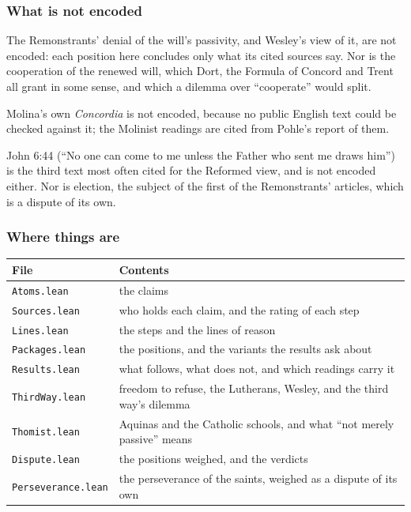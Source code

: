 \documentclass[11pt]{article}
\begin{document}
\subsubsection*{What is not encoded}
The Remonstrants’ denial of the will’s passivity, and Wesley’s view of it, are not encoded: each position here concludes only what its cited sources say. Nor is the cooperation of the renewed will, which Dort, the Formula of Concord and Trent all grant in some sense, and which a dilemma over “cooperate” would split.

Molina’s own \emph{Concordia} is not encoded, because no public English text could be checked against it; the Molinist readings are cited from Pohle’s report of them.

John 6:44 (“No one can come to me unless the Father who sent me draws him”) is the third text most often cited for the Reformed view, and is not encoded either. Nor is election, the subject of the first of the Remonstrants’ articles, which is a dispute of its own.

\subsubsection*{Where things are}
\begin{longtable}{@{}>{\raggedright\arraybackslash}p{} >{\raggedright\arraybackslash}p{}@{}}
\toprule
\textbf{File} & \textbf{Contents} \\
\midrule
\endhead
\texttt{Atoms.lean} & the claims \\
\texttt{Sources.lean} & who holds each claim, and the rating of each step \\
\texttt{Lines.lean} & the steps and the lines of reason \\
\texttt{Packages.lean} & the positions, and the variants the results ask about \\
\texttt{Results.lean} & what follows, what does not, and which readings carry it \\
\texttt{Third\allowbreak{}Way.lean} & freedom to refuse, the Lutherans, Wesley, and the third way’s dilemma \\
\texttt{Thomist.lean} & Aquinas and the Catholic schools, and what “not merely passive” means \\
\texttt{Dispute.lean} & the positions weighed, and the verdicts \\
\texttt{Perseverance.lean} & the perseverance of the saints, weighed as a dispute of its own \\
\bottomrule
\end{longtable}
\end{document}

